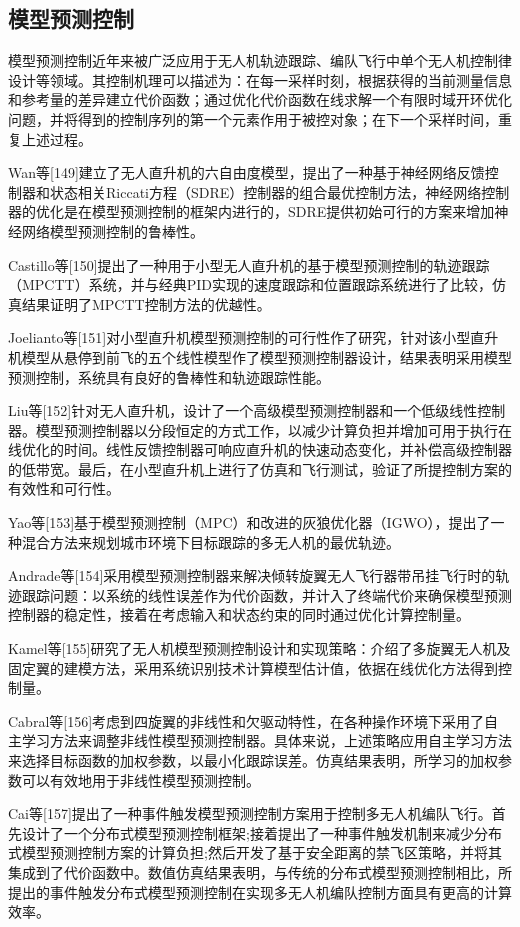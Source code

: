 \subsection{模型预测控制}
模型预测控制近年来被广泛应用于无人机轨迹跟踪、编队飞行中单个无人机控制律设计等领域。其控制机理可以描述为：在每一采样时刻，根据获得的当前测量信息和参考量的差异建立代价函数；通过优化代价函数在线求解一个有限时域开环优化问题，并将得到的控制序列的第一个元素作用于被控对象；在下一个采样时间，重复上述过程。

Wan等[149]建立了无人直升机的六自由度模型，提出了一种基于神经网络反馈控制器和状态相关Riccati方程（SDRE）控制器的组合最优控制方法，神经网络控制器的优化是在模型预测控制的框架内进行的，SDRE提供初始可行的方案来增加神经网络模型预测控制的鲁棒性。

Castillo等[150]提出了一种用于小型无人直升机的基于模型预测控制的轨迹跟踪（MPCTT）系统，并与经典PID实现的速度跟踪和位置跟踪系统进行了比较，仿真结果证明了MPCTT控制方法的优越性。

Joelianto等[151]对小型直升机模型预测控制的可行性作了研究，针对该小型直升机模型从悬停到前飞的五个线性模型作了模型预测控制器设计，结果表明采用模型预测控制，系统具有良好的鲁棒性和轨迹跟踪性能。

Liu等[152]针对无人直升机，设计了一个高级模型预测控制器和一个低级线性控制器。模型预测控制器以分段恒定的方式工作，以减少计算负担并增加可用于执行在线优化的时间。线性反馈控制器可响应直升机的快速动态变化，并补偿高级控制器的低带宽。最后，在小型直升机上进行了仿真和飞行测试，验证了所提控制方案的有效性和可行性。

Yao等[153]基于模型预测控制（MPC）和改进的灰狼优化器（IGWO），提出了一种混合方法来规划城市环境下目标跟踪的多无人机的最优轨迹。

Andrade等[154]采用模型预测控制器来解决倾转旋翼无人飞行器带吊挂飞行时的轨迹跟踪问题：以系统的线性误差作为代价函数，并计入了终端代价来确保模型预测控制器的稳定性，接着在考虑输入和状态约束的同时通过优化计算控制量。

Kamel等[155]研究了无人机模型预测控制设计和实现策略：介绍了多旋翼无人机及固定翼的建模方法，采用系统识别技术计算模型估计值，依据在线优化方法得到控制量。

Cabral等[156]考虑到四旋翼的非线性和欠驱动特性，在各种操作环境下采用了自主学习方法来调整非线性模型预测控制器。具体来说，上述策略应用自主学习方法来选择目标函数的加权参数，以最小化跟踪误差。仿真结果表明，所学习的加权参数可以有效地用于非线性模型预测控制。

Cai等[157]提出了一种事件触发模型预测控制方案用于控制多无人机编队飞行。首先设计了一个分布式模型预测控制框架;接着提出了一种事件触发机制来减少分布式模型预测控制方案的计算负担;然后开发了基于安全距离的禁飞区策略，并将其集成到了代价函数中。数值仿真结果表明，与传统的分布式模型预测控制相比，所提出的事件触发分布式模型预测控制在实现多无人机编队控制方面具有更高的计算效率。

